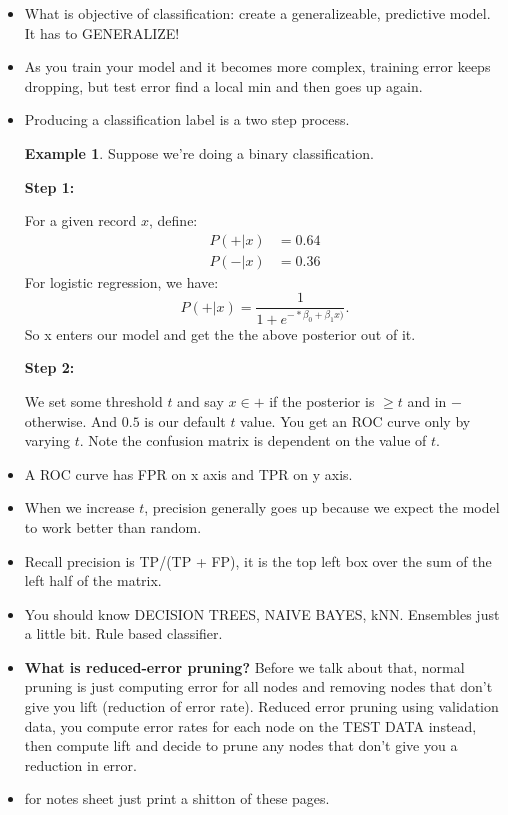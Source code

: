 \documentclass{amsbook}
\theoremstyle{plain}
\numberwithin{section}{chapter}
\numberwithin{equation}{chapter}
\theoremstyle{definition}
\newtheorem{Ex}[theorem]{Example}
\theoremstyle{remark}
\newcommand{\bee}{\begin{equation}\begin{aligned}}
\newcommand{\eee}{\end{aligned}\end{equation}}
\newcommand{\fracc}{\frac}
\begin{document}
\begin{itemize}
\item What is objective of classification: create a generalizeable, predictive model. It has to GENERALIZE!
\item As you train your model and it becomes more complex, training error keeps dropping, but test error find a local min and then goes up again. 
\item Producing a classification label is a two step process. 
\begin{Ex}
Suppose we're doing a binary classification. 

\textbf{Step 1: }

For a given record $x$, define:
\bee
P(+|x) &= 0.64\\
P(-|x) &= 0.36
\eee
For logistic regression, we have:
$$
P(+|x) = \fracc{1}{1 + e^{-*\beta_0 + \beta_1x)}}.
$$
So x enters our model and get the the above posterior out of it. 

\textbf{Step 2:}

We set some threshold $t$ and say $x \in +$ if the posterior is $\geq t$ and in $-$ otherwise. And $0.5$ is our default $t$ value. You get an ROC curve only by varying $t$. Note the confusion matrix is dependent on the value of $t$. 
\end{Ex}
\item A ROC curve has FPR on x axis and TPR on y axis. 
\item When we increase $t$, precision generally goes up because we expect the model to work better than random. 
\item Recall precision is TP/(TP + FP), it is the top left box over the sum of the left half of the matrix. 
\item You should know DECISION TREES, NAIVE BAYES, kNN. Ensembles just a little bit. Rule based classifier. 
\item \textbf{What is reduced-error pruning? }
Before we talk about that, normal pruning is just computing error for all nodes and removing nodes that don't give you lift (reduction of error rate). Reduced error pruning using validation data, you compute error rates for each node on the TEST DATA instead, then compute lift and decide to prune any nodes that don't give you a reduction in error. 
\item for notes sheet just print a shitton of these pages. 
\end{itemize}
\end{document}
